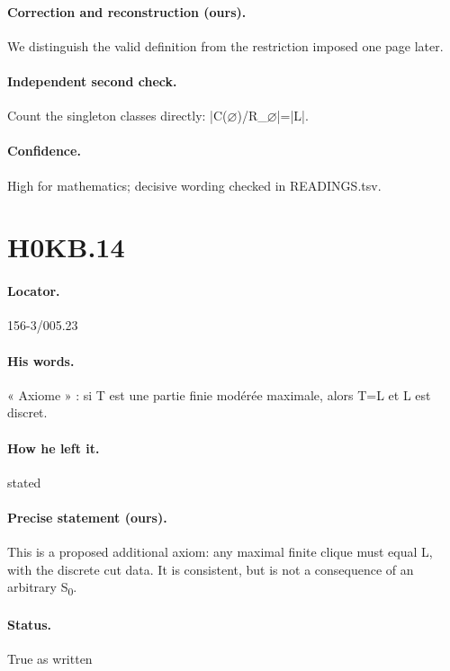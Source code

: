 \paragraph{Correction and reconstruction (ours).} We distinguish the valid definition from the restriction imposed one page later.

\paragraph{Independent second check.} Count the singleton classes directly: |C(\ensuremath{\varnothing})/R\_\ensuremath{\varnothing}|=|L|.

\paragraph{Confidence.} High for mathematics; decisive wording checked in READINGS.tsv.

\section*{H0KB.14}\label{statement:H0KB.14}
\paragraph{Locator.} 156-3/005.23

\paragraph{His words.} « Axiome » : si T est une partie finie modérée maximale, alors T=L et L est discret.

\paragraph{How he left it.} stated

\paragraph{Precise statement (ours).} This is a proposed additional axiom: any maximal finite clique must equal L, with the discrete cut data. It is consistent, but is not a consequence of an arbitrary S\textsubscript{0}.

\paragraph{Status.} True as written

